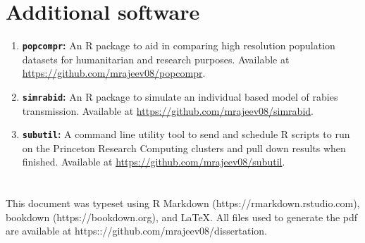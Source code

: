 \documentclass[
  oneside]{book}
\begin{document}
\hypertarget{additional-software}{%
\section*{Additional software}\label{additional-software}}

\begin{enumerate}
\def\labelenumi{\arabic{enumi}.}
\item
  \textbf{\texttt{popcompr}:} An R package to aid in comparing high resolution population datasets for humanitarian and research purposes. Available at \url{https://github.com/mrajeev08/popcompr}.
\item
  \textbf{\texttt{simrabid}:} An R package to simulate an individual based model of rabies transmission. Available at \url{https://github.com/mrajeev08/simrabid}.
\item
  \textbf{\texttt{subutil}:} A command line utility tool to send and schedule R scripts to run on the Princeton Research Computing clusters and pull down results when finished. Available at \url{https://github.com/mrajeev08/subutil}.
\end{enumerate}

\backmatter

\pagestyle{empty}

\hfill

\vfill


\section*{}
This document was typeset using R Markdown (https://rmarkdown.rstudio.com), bookdown (https://bookdown.org), and
\LaTeX. All files used to generate the pdf are available at https:://github.com/mrajeev08/dissertation. 
\end{document}
